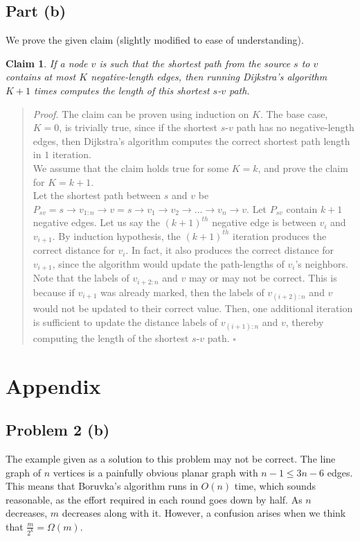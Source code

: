 \documentclass[9pt]{article}
\newtheorem{claim}{Claim}
\begin{document}
\subsection*{Part (b)}
We prove the given claim (slightly modified to ease of understanding).
\begin{claim}
    If a node $v$ is such that the shortest path from the source $s$ to $v$ contains
    at most $K$ negative-length edges, then running Dijkstra's algorithm $K+1$ times
    computes the length of this shortest $s$-$v$ path.
\end{claim}
\begin{quote}
\textit{Proof.}
The claim can be proven using induction on $K$. The base case, $K = 0$, is trivially true,
since if the shortest $s$-$v$ path has no negative-length edges, then Dijkstra's algorithm
computes the correct shortest path length in $1$ iteration. \\
We assume that the claim holds true for some $K = k$, and prove the claim for $K = k+1$. \\
Let the shortest path between $s$ and $v$ be $P_{sv} = s \rightarrow v_{1:n} \rightarrow v =
s \rightarrow v_{1} \rightarrow v_{2} \rightarrow \dots \rightarrow v_{n} \rightarrow v$. Let $P_{sv}$ contain $k+1$ negative edges.
Let us say the $(k+1)^{th}$ negative edge is between $v_{i}$ and $v_{i+1}$. By induction hypothesis,
the $(k+1)^{th}$ iteration produces the correct distance for $v_{i}$. In fact, it also produces
the correct distance for $v_{i+1}$, since the algorithm would update the path-lengths of
$v_{i}$'s neighbors. Note that the labels of $v_{i+2:n}$ and $v$ may or may not be correct.
This is because if $v_{i+1}$ was already marked, then the labels of $v_{(i+2):n}$ and $v$ would
not be updated to their correct value.
Then, one additional iteration is sufficient to update the distance labels
of $v_{(i+1):n}$ and $v$, thereby computing the length of the shortest
$s$-$v$ path.
\hfill $\square$
\end{quote}

\section*{Appendix}

\subsection*{Problem 2 (b)}
The example given as a solution to this problem may not be correct. The line graph of $n$ vertices
is a painfully obvious planar graph with $n-1 \leq 3n - 6$ edges. This means that Boruvka's
algorithm runs in $O(n)$ time, which sounds reasonable, as the effort required in each round
goes down by half. As $n$ decreases, $m$ decreases along with it. However, a confusion arises when
we think that $\frac{m}{2^{k}} = \Omega(m)$.
\end{document}
